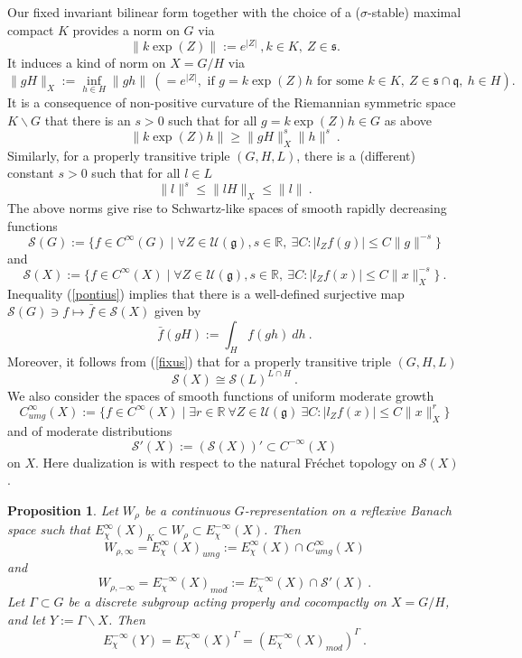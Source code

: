 \documentclass[10]{amsart}
\newtheorem{pro}[thm]{Proposition}
\theoremstyle{remark}
\theoremstyle{definition}
\numberwithin{equation}{section}
\newcommand{\R}{\mathbb{R}}           %
\newcommand{\fg}{{\mathfrak g}}
\newcommand{\fq}{{\mathfrak q}}
\newcommand{\fs}{{\mathfrak s}}
\newcommand{\Cal}{\mathcal}
\newcommand{\be}{\begin{equation}}
\begin{document}
{Our fixed invariant bilinear form together with the choice of a ($\sigma$-stable) maximal compact $K$  provides a norm on $G$ via
$$  \|k\exp(Z)\|:=e^{|Z|}\ , k\in K,\ Z\in\fs.$$
It induces a kind of norm on $X=G/H$ via
$$ \|gH\|_X:=\inf_{h\in H}\|gh\|\ \left (=e^{|Z|}, \mbox{ if } g=k\exp(Z) h \mbox{ for some }  k\in K,\ Z\in\fs\cap \fq,\ h\in H\right ).$$
It is a consequence of non-positive curvature of the Riemannian symmetric space $K\backslash G$ that there is an $s>0$ such that for all $g=k\exp(Z) h\in G$ as above
\be\label{pontius}
\|k\exp(Z) h\|\ge \|gH\|_X^s \|h\|^s\ .
\end{equation}
Similarly, for a properly transitive triple $(G,H,L)$, there is a (different) constant $s>0$ such that for all $l\in L$
\be\label{fixus}   \|l\|^s\le \|lH\|_X\le \|l\|\ .
\end{equation}
The above norms give rise to Schwartz-like spaces of smooth rapidly decreasing functions
$$ {\Cal S}(G):=\{f\in C^\infty(G)\mid \forall Z\in {\Cal U}(\fg), s\in \R,\ \exists C: | l_Zf(g)|\le C \|g\|^{-s}\}$$
and 
$$ {\Cal S}(X):=\{f\in C^\infty(X)\mid \forall Z\in {\Cal U}(\fg), s\in \R,\ \exists C: | l_Zf(x)|\le C \|x\|_X^{-s}\}\ .$$
Inequality (\ref{pontius}) implies that there is a well-defined surjective map ${\Cal S}(G)\ni f\mapsto \bar f\in  {\Cal S}(X)$ given by
$$ \bar f (gH):=\int_H f(gh)\:dh\ .$$
Moreover, it
follows from (\ref{fixus}) that for a properly transitive triple $(G,H,L)$
\be\label{pilatus}  {\Cal S}(X)\cong {\Cal S}(L)^{L\cap H}\ .
\end{equation}
We also consider the spaces of smooth functions of uniform moderate growth
$$ C^\infty_{umg}(X):=\{f\in C^\infty(X)\mid \exists r\in \R\ \forall Z\in {\Cal U}(\fg)\ \exists C: | l_Zf(x)|\le C \|x\|_X^{r}\}$$
and of moderate distributions
$$ {\Cal S}'(X):=({\Cal S}(X))'\subset C^{-\infty}(X)$$
on $X$. Here dualization is with respect to the natural 
Fr\' echet topology on ${\Cal S}(X)$.

\begin{pro}\label{englisch}
Let $W_\rho$ be a continuous $G$-representation on a reflexive Banach space such that $E^{\infty}_\chi(X)_K\subset W_\rho\subset E_\chi^{-\infty}(X)$.
Then $$W_{\rho,\infty}=E^{\infty}_\chi(X)_{umg}:=E^{\infty}_\chi(X)\cap C^\infty_{umg}(X)$$ 
and
$$W_{\rho,-\infty}=E^{-\infty}_\chi(X)_{mod}:=E^{-\infty}_\chi(X)\cap {\Cal S}'(X)\ .$$
Let $\Gamma\subset G$ be a discrete subgroup acting properly and cocompactly on $X=G/H$, and let $Y:=\Gamma\backslash X$. Then
\be\label{klaus1} E^{-\infty}_\chi(Y)=E^{-\infty}_\chi(X)^\Gamma=(E^{-\infty}_\chi(X)_{mod})^\Gamma\ .\nonumber
\end{equation}
\end{pro}

}
\end{document}
